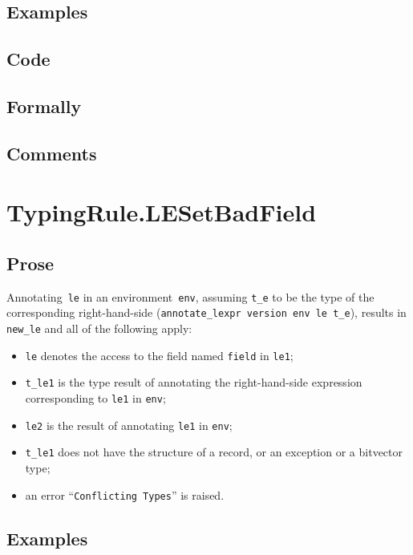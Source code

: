\documentclass{book}
\begin{document}
  \subsection{Examples}

  \subsection{Code}

  \subsection{Formally}

  \subsection{Comments}

\section{TypingRule.LESetBadField \label{sec:TypingRule.LESetBadField}}

    \subsection{Prose}
   Annotating~\texttt{le} in an environment~\texttt{env}, assuming
\texttt{t\_e} to be the type of the corresponding right-hand-side
(\texttt{annotate\_lexpr version env le t\_e}), results in \texttt{new\_le} and
all of the following apply:
   \begin{itemize}
   \item \texttt{le} denotes the access to the field named \texttt{field} in \texttt{le1};
   \item \texttt{t\_le1} is the type result of annotating the right-hand-side expression corresponding to \texttt{le1} in \texttt{env};
   \item \texttt{le2} is the result of annotating \texttt{le1} in \texttt{env};
   \item \texttt{t\_le1} does not have the structure of a record, or an exception or a bitvector type;
   \item an error ``\texttt{Conflicting Types}'' is raised.
   \end{itemize}

  \subsection{Examples}
\end{document}
